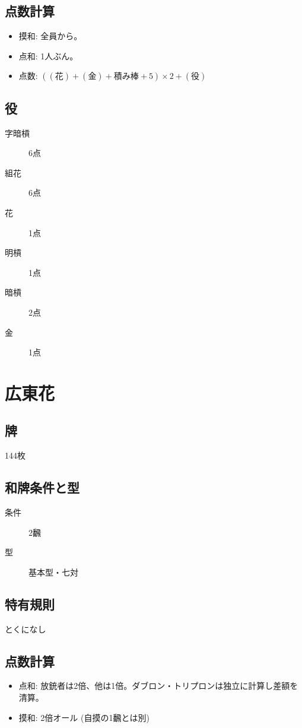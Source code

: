 \documentclass{ltjsarticle}
\begin{document}
\subsection{点数計算}
\begin{itemize}
    \item 摸和: 全員から。
    \item 点和: 1人ぶん。
    \item 点数: $((\text{花})+(\text{金})+\text{積み棒}+5)\times2+(\text{役})$
\end{itemize}
\subsection{役}
\begin{description}
    \item[字暗槓] 6点
    \item[組花] 6点
    \item[花] 1点
    \item[明槓] 1点
    \item[暗槓] 2点
    \item[金] 1点
    \item[]
\end{description}
\section{広東花}
\subsection{牌}144枚
\subsection{和牌条件と型}
\begin{description}
    \item[条件] 2飜
    \item[型] 基本型・七対
\end{description}
\subsection{特有規則}
とくになし
\subsection{点数計算}
\begin{itemize}
    \item 点和: 放銃者は2倍、他は1倍。ダブロン・トリプロンは独立に計算し差額を清算。
    \item 摸和: 2倍オール (自摸の1飜とは別)
\end{itemize}
\end{document}
